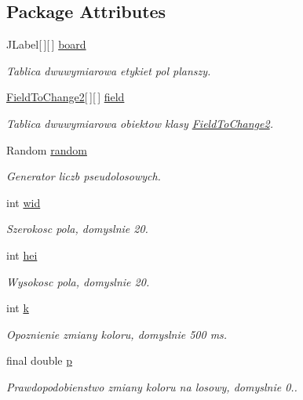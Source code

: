 \subsection*{Package Attributes}
\begin{DoxyCompactItemize}
\item 
J\-Label\mbox{[}$\,$\mbox{]}\mbox{[}$\,$\mbox{]} \hyperlink{classBoard2_a591cfed002537e354f23f8e34c2af16b}{board}
\begin{DoxyCompactList}\small\item\em Tablica dwuwymiarowa etykiet pol planszy. \end{DoxyCompactList}\item 
\hyperlink{classFieldToChange2}{Field\-To\-Change2}\mbox{[}$\,$\mbox{]}\mbox{[}$\,$\mbox{]} \hyperlink{classBoard2_a1b9b09d4149a62fbb51d84bc2605dbab}{field}
\begin{DoxyCompactList}\small\item\em Tablica dwuwymiarowa obiektow klasy \hyperlink{classFieldToChange2}{Field\-To\-Change2}. \end{DoxyCompactList}\item 
Random \hyperlink{classBoard2_ada7b5c5a270ea7e76387dae977fc3cdd}{random}
\begin{DoxyCompactList}\small\item\em Generator liczb pseudolosowych. \end{DoxyCompactList}\item 
int \hyperlink{classBoard2_a7873fa80bb562ba0ce7c93f76eddc8f3}{wid}
\begin{DoxyCompactList}\small\item\em Szerokosc pola, domyslnie 20. \end{DoxyCompactList}\item 
int \hyperlink{classBoard2_a465a4d61359fc92c11cafdd8d0745ec0}{hei}
\begin{DoxyCompactList}\small\item\em Wysokosc pola, domyslnie 20. \end{DoxyCompactList}\item 
int \hyperlink{classBoard2_a0c416dfe261333a6ef3dcd7f7b38b234}{k}
\begin{DoxyCompactList}\small\item\em Opoznienie zmiany koloru, domyslnie 500 ms. \end{DoxyCompactList}\item 
final double \hyperlink{classBoard2_a697bd8c3fd4b418c6570a9ad6c6dfdf9}{p}
\begin{DoxyCompactList}\small\item\em Prawdopodobienstwo zmiany koloru na losowy, domyslnie 0.. \end{DoxyCompactList}\end{DoxyCompactItemize}



